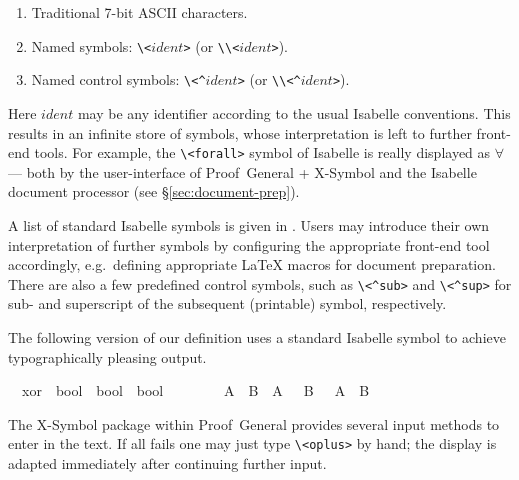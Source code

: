 \begin{isabellebody}
\begin{isamarkuptext}
\begin{enumerate}
  \item Traditional 7-bit ASCII characters.

  \item Named symbols: \verb,\,\verb,<,$ident$\verb,>, (or
  \verb,\\,\verb,<,$ident$\verb,>,).

  \item Named control symbols: \verb,\,\verb,<^,$ident$\verb,>, (or
  \verb,\\,\verb,<^,$ident$\verb,>,).

  \end{enumerate}

  Here $ident$ may be any identifier according to the usual Isabelle
  conventions.  This results in an infinite store of symbols, whose
  interpretation is left to further front-end tools.  For example, the
  \verb,\,\verb,<forall>, symbol of Isabelle is really displayed as
  $\forall$ --- both by the user-interface of Proof~General + X-Symbol
  and the Isabelle document processor (see \S\ref{sec:document-prep}).

  A list of standard Isabelle symbols is given in
  \cite[appendix~A]{isabelle-sys}.  Users may introduce their own
  interpretation of further symbols by configuring the appropriate
  front-end tool accordingly, e.g.\ defining appropriate {\LaTeX}
  macros for document preparation.  There are also a few predefined
  control symbols, such as \verb,\,\verb,<^sub>, and
  \verb,\,\verb,<^sup>, for sub- and superscript of the subsequent
  (printable) symbol, respectively.

  \medskip The following version of our  definition uses a
  standard Isabelle symbol to achieve typographically pleasing output.%
\end{isamarkuptext}%
\isamarkuptrue%
\isamarkupfalse%
\isamarkupfalse%
\isanewline
\ \ xor\ {\isacharcolon}{\isacharcolon}\ {\isachardoublequote}bool\ {\isasymRightarrow}\ bool\ {\isasymRightarrow}\ bool{\isachardoublequote}\ \ \ \ {\isacharparenleft}\ {\isachardoublequote}{\isasymoplus}{\isachardoublequote}\ {}{}{\isacharparenright}\isanewline
\ \ {\isachardoublequote}A\ {\isasymoplus}\ B\ {\isasymequiv}\ {\isacharparenleft}A\ {\isasymand}\ {\isasymnot}\ B{\isacharparenright}\ {\isasymor}\ {\isacharparenleft}{\isasymnot}\ A\ {\isasymand}\ B{\isacharparenright}{\isachardoublequote}\isamarkupfalse%
\isamarkupfalse%
%
\begin{isamarkuptext}%
The X-Symbol package within Proof~General provides several input
  methods to enter \isa{{\isasymoplus}} in the text.  If all fails one may just
  type \verb,\,\verb,<oplus>, by hand; the display is adapted
  immediately after continuing further input.


\end{isamarkuptext}
\end{isabellebody}
